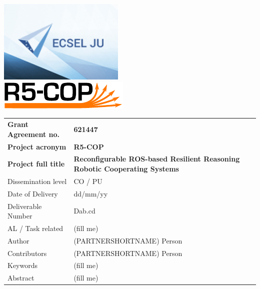\thispagestyle{empty}
{\noindent\centering\includegraphics[height=4cm]{pics/ecsel-logo}~~~~~~\\[3cm]}
{\noindent\centering\includegraphics{pics/r5-cop}\\[1cm]}

\begin{tabular}{|p{4.5cm}p{11cm}|}
\hline
\rowcolor[gray]{0.8}
\bf Grant Agreement no.
	& \bf 621447\\
\rowcolor[gray]{0.8}
\bf Project acronym
	& \bf R5-COP\\
\rowcolor[gray]{0.8}
\bf	Project full title
	& \bf Reconfigurable ROS-based Resilient Reasoning Robotic Cooperating Systems\\
\hline

Dissemination level
	& CO / PU\\
Date of Delivery
	& dd/mm/yy\\
Deliverable Number
	& Dab.cd\\
AL / Task related
	& (fill me)\\
Author
	& (PARTNERSHORTNAME) Person\\
Contributors
	& (PARTNERSHORTNAME) Person\\
Keywords
	& (fill me)\\
Abstract &
	(fill me)\\
\hline
\end{tabular}
\vfill\eject
